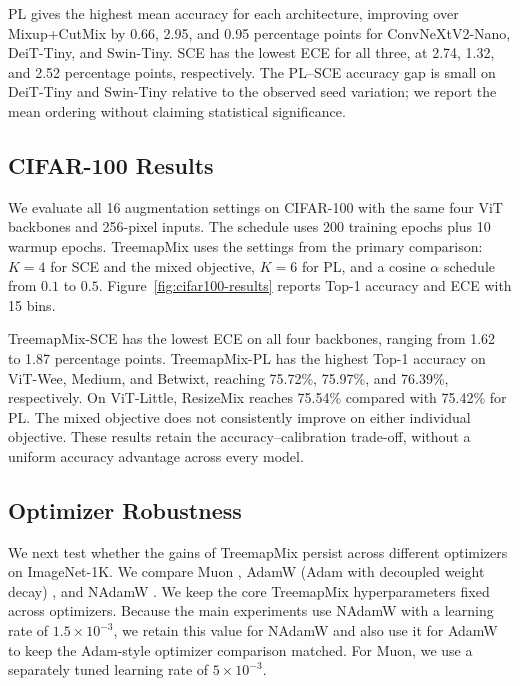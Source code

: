 PL gives the highest mean accuracy for each architecture, improving over
Mixup+CutMix by 0.66, 2.95, and 0.95 percentage points for ConvNeXtV2-Nano,
DeiT-Tiny, and Swin-Tiny. SCE has the lowest ECE for all three, at 2.74,
1.32, and 2.52 percentage points, respectively. The PL--SCE accuracy gap is
small on DeiT-Tiny and Swin-Tiny relative to the observed seed variation;
we report the mean ordering without claiming statistical significance.


\subsection{CIFAR-100 Results}
\label{app:cifar100-results}
We evaluate all 16 augmentation settings on CIFAR-100 with the same four
ViT backbones and 256-pixel inputs. The schedule uses 200 training epochs plus
10 warmup epochs. TreemapMix uses the settings from the primary comparison:
$K=4$ for SCE and the mixed objective, $K=6$ for PL, and a
cosine $\alpha$ schedule from $0.1$ to $0.5$.
Figure~\ref{fig:cifar100-results} reports Top-1 accuracy and ECE with 15 bins.

TreemapMix-SCE has the lowest ECE on all four backbones, ranging from
1.62 to 1.87 percentage points. TreemapMix-PL has the highest Top-1 accuracy
on ViT-Wee, Medium, and Betwixt, reaching 75.72\%, 75.97\%, and 76.39\%,
respectively. On ViT-Little, ResizeMix reaches 75.54\% compared with
75.42\% for PL. The mixed objective does not consistently improve on either
individual objective. These results retain the accuracy--calibration
trade-off, without a uniform accuracy advantage across every model.



\subsection{Optimizer Robustness}
\label{app:optimizer-robustness}
We next test whether the gains of TreemapMix persist across different
optimizers on ImageNet-1K. We compare Muon
\citep{jordan2024muon}, AdamW (Adam with decoupled weight decay)
\citep{loshchilovDecoupledWeightDecay2019}, and NAdamW
\citep{Dahl2023AlgoPerf,Kasimbeg2025AlgoPerfResults}. We keep the core
TreemapMix hyperparameters fixed across optimizers. Because the main
experiments use NAdamW with a learning rate of $1.5\times10^{-3}$, we retain
this value for NAdamW and also use it for AdamW to keep the Adam-style
optimizer comparison matched. For Muon, we use a separately tuned learning
rate of $5\times10^{-3}$.

